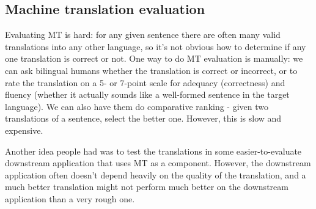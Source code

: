 \subsection{Machine translation evaluation}
Evaluating MT is hard: for any given sentence there are often many valid translations into any other language, so it's not obvious how to determine if any one translation is correct or not. One way to do MT evaluation is manually: we can ask bilingual humans whether the translation is correct or incorrect, or to rate the translation on a 5- or 7-point scale for adequacy (correctness) and fluency (whether it actually sounds like a well-formed sentence in the target language). We can also have them do comparative ranking - given two translations of a sentence, select the better one. However, this is slow and expensive.

Another idea people had was to test the translations in some easier-to-evaluate downstream application that uses MT as a component. However, the downstream application often doesn't depend heavily on the quality of the translation, and a much better translation might not perform much better on the downstream application than a very rough one.

